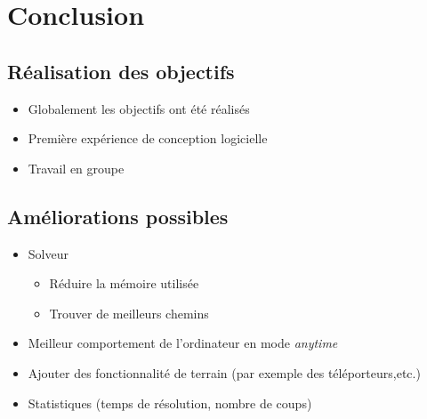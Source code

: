 \documentclass{beamer}
\begin{document}
\section{Conclusion}
\subsection{Réalisation des objectifs}
\begin{frame}
\begin{itemize}
\item Globalement les objectifs ont été réalisés
\item Première expérience de conception logicielle
\item Travail en groupe
\end{itemize}
\end{frame}

\subsection{Améliorations possibles}
\begin{frame}
\begin{itemize}
\item Solveur
\begin{itemize}
\item Réduire la mémoire utilisée
\item Trouver de meilleurs chemins
\end{itemize}
\item Meilleur comportement de l'ordinateur en mode \textit{anytime}
\item Ajouter des fonctionnalité de terrain (par exemple des téléporteurs,etc.)
\item Statistiques (temps de résolution, nombre de coups)
\end{itemize}
\end{frame}
\end{document}
